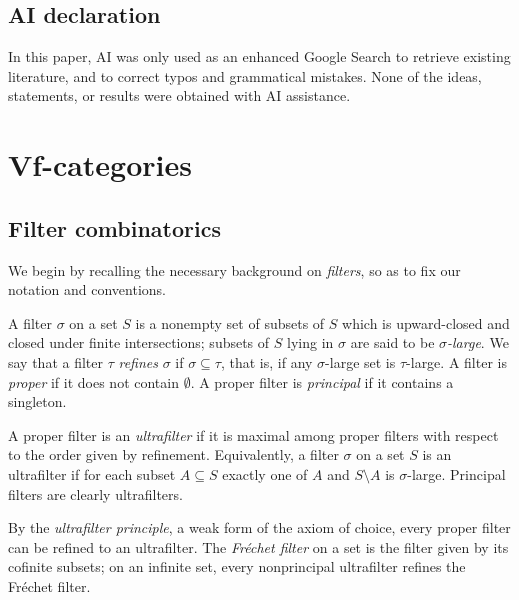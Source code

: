 \subsection*{AI declaration}In this paper, AI was only used as an enhanced Google Search to retrieve existing literature, and to correct typos and grammatical mistakes. None of the ideas, statements, or results were obtained with AI assistance.

\section{Vf-categories}\label{sec:vf-cats}

\subsection{Filter combinatorics}\label{ssec:filters-ultrafilters}
We begin by recalling the necessary background on \emph{filters}, so as to fix our notation and conventions. 

\begin{defn}[Filters]
    A filter $\sigma$ on a set $S$ is a nonempty set of subsets of $S$ which is upward-closed and closed under finite intersections; subsets of $S$ lying in $\sigma$ are said to be \emph{$\sigma$-large}. We say that a filter $\tau$ \emph{refines} $\sigma$ if $\sigma \subseteq \tau$, that is, if any $\sigma$-large set is $\tau$-large. A filter is \emph{proper} if it does not contain $\emptyset$. A proper filter is \emph{principal} if it contains a singleton.
\end{defn}

\begin{defn}[Ultrafilters]
    A proper filter is an \emph{ultrafilter} if it is maximal among proper filters with respect to the order given by refinement. Equivalently, a filter $\sigma$ on a set $S$ is an ultrafilter if for each subset $A\subseteq S$ exactly one of $A$ and $S\setminus A$ is $\sigma$-large. Principal filters are clearly ultrafilters.
\end{defn}

\begin{rmk}
    By the \emph{ultrafilter principle}, a weak form of the axiom of choice, every proper filter can be refined to an ultrafilter. The \emph{Fréchet filter} on a set is the filter given by its cofinite subsets; on an infinite set, every nonprincipal ultrafilter refines the Fréchet filter.
\end{rmk}

